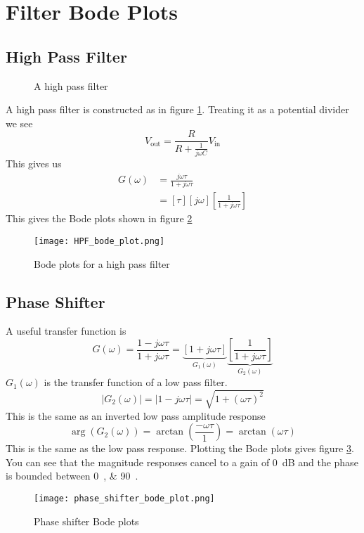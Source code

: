\documentclass{article}
\begin{document}
    \section{Filter Bode Plots}
    \subsection{High Pass Filter}
    \begin{figure}[ht]
        \centering
        \caption{A high pass filter}
        \label{fig:high pass filter}
    \end{figure}
    A high pass filter is constructed as in figure \ref{fig:high pass filter}.
    Treating it as  a potential divider we see
    \[V_\text{out} = \frac{R}{R + \frac{1}{j\omega C}}V_\text{in}\]
    This gives us
    \begin{align*}
        G(\omega) &= \frac{j\omega \tau}{1 + j\omega \tau}\\
        &= [\tau][j\omega]\left[\frac{1}{1 + j\omega\tau}\right]
    \end{align*}
    This gives the Bode plots shown in figure \ref{fig:bode plots HPF}
    \begin{figure}[ht]
        \centering
        \texttt{[image: HPF\_bode\_plot.png]}
        \caption{Bode plots for a high pass filter}
        \label{fig:bode plots HPF} 
    \end{figure}
    
    \subsection{Phase Shifter}
    A useful transfer function is
    \[G(\omega) = \frac{1 - j\omega\tau}{1 + j\omega \tau} = \underbrace{[1 + j\omega\tau]}_{G_1(\omega)} \underbrace{\left[\frac{1}{1 + j\omega\tau}\right]}_{G_2(\omega)}\]
    \(G_1(\omega)\) is the transfer function of a low pass filter.
    \[|G_2(\omega)| = |1 - j\omega\tau| = \sqrt{1 + (\omega\tau)^2}\]
    This is the same as an inverted low pass amplitude response
    \[\arg(G_2(\omega)) = \arctan\left(\frac{-\omega\tau}{1}\right) = \arctan(\omega\tau)\]
    This is the same as the low pass response.
    Plotting the Bode plots gives figure \ref{fig:phase shifter bode plot}.
    You can see that the magnitude responses cancel to a gain of \SI{0}{dB} and the phase is bounded between \SIlist{0;90}{\SIUnitSymbolDegree}.
    \begin{figure}[ht]
        \centering
        \texttt{[image: phase\_shifter\_bode\_plot.png]}
        \caption{Phase shifter Bode plots}
        \label{fig:phase shifter bode plot}
    \end{figure}
    
\end{document}

